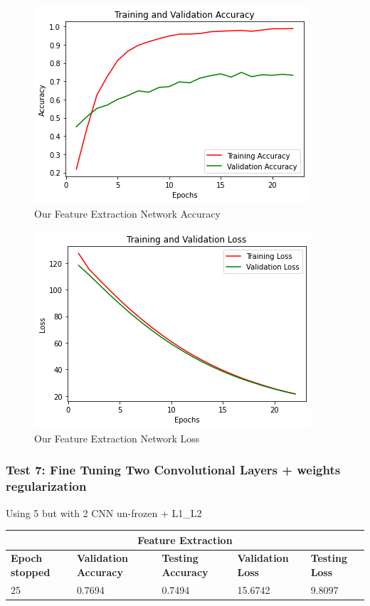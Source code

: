 \medskip

\begin{figure}[H]
	\centering
	\includegraphics[height=0.45\textwidth]{img/vgg16ft1dropregacc.png}
	\caption{Our Feature Extraction Network Accuracy}
	\label{fig:vgg16ft1dropregacc}
\end{figure}

\begin{figure}[H]
	\centering
	\includegraphics[height=0.45\textwidth]{img/vgg16ft1dropregloss.png}
	\caption{Our Feature Extraction Network Loss}
	\label{fig:vgg16ft1dropregloss}
\end{figure}









\subsubsection{Test 7: Fine Tuning Two Convolutional Layers + weights regularization}
Using 5 but with 2 CNN un-frozen + L1\_L2

 \medskip

\begin{tabular}{ |p{2cm}|p{2cm}|p{2cm}|p{2cm}|p{2cm}|  }
\hline
\multicolumn{5}{|c|}{Feature Extraction} \\
\hline
\textbf{Epoch stopped} & \textbf{Validation Accuracy} & \textbf{Testing Accuracy} & \textbf{Validation Loss} & \textbf{Testing Loss} \\
\hline
25 & 0.7694 & 0.7494 & 15.6742 & 9.8097\\
\hline
\end{tabular}

